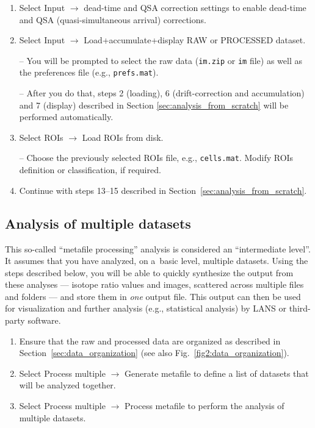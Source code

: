 \documentclass[a4paper, 11pt]{article}
\newcommand{\ttt}[1]{\texttt{#1}}
\newcommand{\lans}[1]{{\color{magenta}#1}}
\newcommand\ra{\rightarrow}
\newcommand\addon[1]{-- {\small #1}}
\begin{document}
\begin{enumerate}

\item Select \lans{Input} $\ra$ \lans{dead-time and QSA correction settings} to enable dead-time and QSA (quasi-simultaneous arrival) corrections.

\item Select \lans{Input} $\ra$ \lans{Load+accumulate+display RAW or PROCESSED dataset}. 

\addon{You will be prompted to select the raw data (\ttt{im.zip} or \ttt{im} file) as well as the preferences file (e.g., \ttt{prefs.mat}). }

\addon{After you do that, steps 2 (loading), 6 (drift-correction and accumulation) and 7 (display) described in Section \ref{sec:analysis_from_scratch} will be performed automatically.}
 
\item Select \lans{ROIs} $\ra$ \lans{Load ROIs from disk}.

\addon{Choose the previously selected ROIs file, e.g., \ttt{cells.mat}. Modify ROIs definition or classification, if required.}

\item Continue with steps 13--15 described in Section~\ref{sec:analysis_from_scratch}.

\end{enumerate}


\subsection{Analysis of multiple datasets}

This so-called ``metafile processing'' analysis is considered an ``intermediate level''. It assumes that you have analyzed, on a~basic level, multiple datasets. Using the steps described below, you will be able to quickly synthesize the output from these analyses --- isotope ratio values and images, scattered across multiple files and folders --- and store them in \emph{one} output file. This output can then be used for visualization and further analysis (e.g., statistical analysis) by LANS or third-party software. 

\begin{enumerate}

\item Ensure that the raw and processed data are organized as described in Section~\ref{sec:data_organization} (see also Fig.~\ref{fig2:data_organization}).

\item Select \lans{Process multiple} $\ra$ \lans{Generate metafile} to define a list of datasets that will be analyzed together.


\item Select \lans{Process multiple} $\ra$ \lans{Process metafile} to perform the analysis of multiple datasets.

\end{enumerate}
\end{document}
